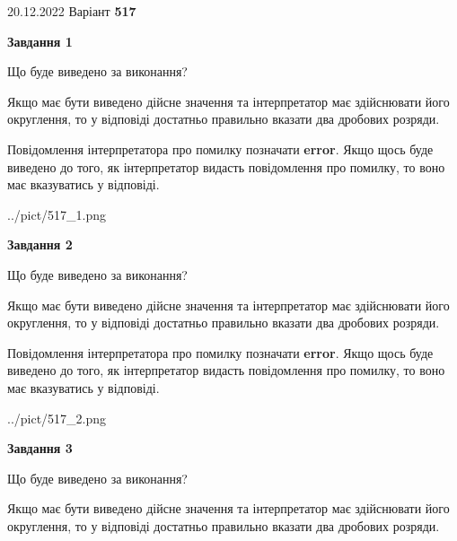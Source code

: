 \documentclass[12pt, ukrainian]{article}
\begin{document}
{20.12.2022 Варіант \No \textbf { 517 }\par}
{
\begin {Large}

{\begin {center}\textbf{Завдання 1}\end {center}}\par
Що буде виведено за виконання? \par

Якщо має бути виведено дійсне значення та інтерпретатор має здійснювати його округлення, 
то у відповіді достатньо правильно вказати два дробових розряди.

Повідомлення інтерпретатора про помилку позначати \textbf{error}.
Якщо щось буде виведено до того, як інтерпретатор видасть повідомлення про помилку, 
то воно має вказуватись у відповіді. \par

\begin{center}
	{../pict/517_1.png}
\end{center}
\newpage

{\begin {center}\textbf{Завдання 2}\end {center}}\par
Що буде виведено за виконання? \par

Якщо має бути виведено дійсне значення та інтерпретатор має здійснювати його округлення, 
то у відповіді достатньо правильно вказати два дробових розряди.

Повідомлення інтерпретатора про помилку позначати \textbf{error}.
Якщо щось буде виведено до того, як інтерпретатор видасть повідомлення про помилку, 
то воно має вказуватись у відповіді. \par

\begin{center}
	{../pict/517_2.png}
\end{center}
\newpage

{\begin {center}\textbf{Завдання 3}\end {center}}\par
Що буде виведено за виконання? \par

Якщо має бути виведено дійсне значення та інтерпретатор має здійснювати його округлення, 
то у відповіді достатньо правильно вказати два дробових розряди.


\end{Large}}
\end{document}
